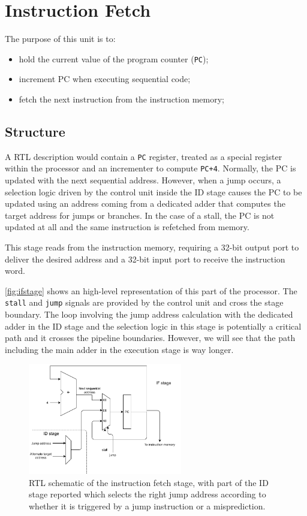 \section{Instruction Fetch}
The purpose of this unit is to:
\begin{itemize}
	\item hold the current value of the program counter (\texttt{PC});
	\item increment PC when executing sequential code;
	\item fetch the next instruction from the instruction memory;
\end{itemize}

\subsection{Structure} A RTL description would contain a \texttt{PC} register, treated as a special register within the processor and an incrementer to compute \texttt{PC+4}. Normally, the PC is updated with the next sequential address. However, when a jump occurs, a selection logic driven by the control unit inside the ID stage causes the PC to be updated using an address coming from a dedicated adder that computes the target address for jumps or branches. In the case of a stall, the PC is not updated at all and the same instruction is refetched from memory.

This stage reads from the instruction memory, requiring a 32-bit output port to deliver the desired address and a 32-bit input port to receive the instruction word.

\autoref{fig:ifstage} shows an high-level representation of this part of the processor. The \texttt{stall} and \texttt{jump} signals are provided by the control unit and cross the stage boundary. The loop involving the jump address calculation with the dedicated adder in the ID stage and the selection logic in this stage is potentially a critical path and it crosses the pipeline boundaries. However, we will see that the path including the main adder in the execution stage is way longer.

\begin{figure}[htbp]
	\centering
	\includegraphics[width=0.6\textwidth]{../images/IF.pdf}
	\caption{RTL schematic of the instruction fetch stage, with part of the ID stage reported which selects the right jump address according to whether it is triggered by a jump instruction or a misprediction.}
	\label{fig:ifstage}
\end{figure}
